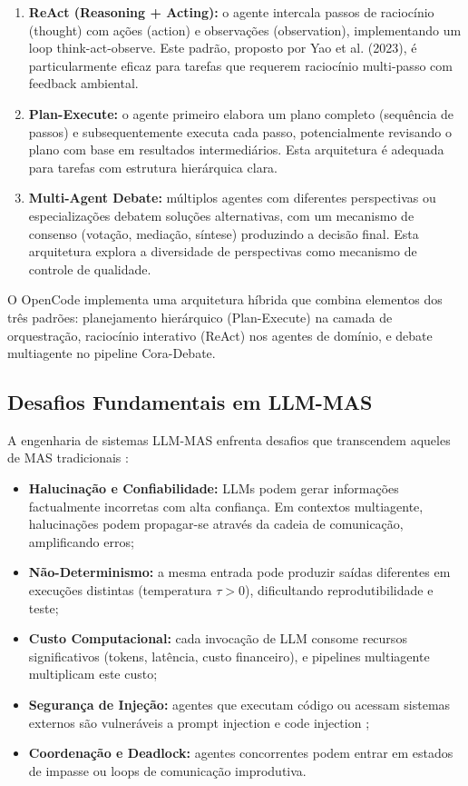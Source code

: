 \documentclass[12pt,a4paper,sumario=tradicional]{abntex2}
\begin{document}
\begin{enumerate}[leftmargin=*]
    \item \textbf{ReAct (Reasoning + Acting):} o agente intercala passos de raciocínio (thought) com ações (action) e observações (observation), implementando um loop think-act-observe. Este padrão, proposto por Yao et al. (2023), é particularmente eficaz para tarefas que requerem raciocínio multi-passo com feedback ambiental.
    \item \textbf{Plan-Execute:} o agente primeiro elabora um plano completo (sequência de passos) e subsequentemente executa cada passo, potencialmente revisando o plano com base em resultados intermediários. Esta arquitetura é adequada para tarefas com estrutura hierárquica clara.
    \item \textbf{Multi-Agent Debate:} múltiplos agentes com diferentes perspectivas ou especializações debatem soluções alternativas, com um mecanismo de consenso (votação, mediação, síntese) produzindo a decisão final. Esta arquitetura explora a diversidade de perspectivas como mecanismo de controle de qualidade.
\end{enumerate}

O OpenCode implementa uma arquitetura híbrida que combina elementos dos três padrões: planejamento hierárquico (Plan-Execute) na camada de orquestração, raciocínio interativo (ReAct) nos agentes de domínio, e debate multiagente no pipeline Cora-Debate.

\subsection{Desafios Fundamentais em LLM-MAS}

A engenharia de sistemas LLM-MAS enfrenta desafios que transcendem aqueles de MAS tradicionais \cite{rasheed2026llm, bowers2025analyzing}:

\begin{itemize}
    \item \textbf{Halucinação e Confiabilidade:} LLMs podem gerar informações factualmente incorretas com alta confiança. Em contextos multiagente, halucinações podem propagar-se através da cadeia de comunicação, amplificando erros;
    \item \textbf{Não-Determinismo:} a mesma entrada pode produzir saídas diferentes em execuções distintas (temperatura $\tau > 0$), dificultando reprodutibilidade e teste;
    \item \textbf{Custo Computacional:} cada invocação de LLM consome recursos significativos (tokens, latência, custo financeiro), e pipelines multiagente multiplicam este custo;
    \item \textbf{Segurança de Injeção:} agentes que executam código ou acessam sistemas externos são vulneráveis a prompt injection e code injection \cite{bowers2025analyzing};
    \item \textbf{Coordenação e Deadlock:} agentes concorrentes podem entrar em estados de impasse ou loops de comunicação improdutiva.
\end{itemize}
\end{document}
